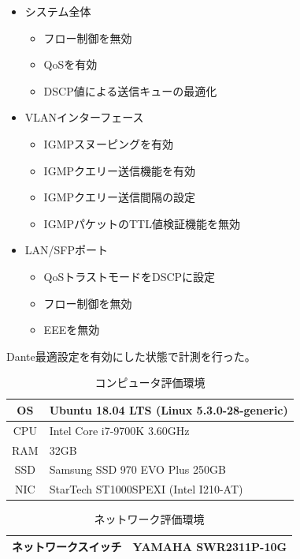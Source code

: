 \begin{itemize}
  \item システム全体
  \begin{itemize}
    \item フロー制御を無効
    \item QoSを有効
    \item DSCP値による送信キューの最適化
  \end{itemize}
  \item VLANインターフェース
  \begin{itemize}
    \item IGMPスヌーピングを有効
    \item IGMPクエリー送信機能を有効
    \item IGMPクエリー送信間隔の設定
    \item IGMPパケットのTTL値検証機能を無効
  \end{itemize}
  \item LAN/SFPポート
  \begin{itemize}
    \item QoSトラストモードをDSCPに設定
    \item フロー制御を無効
    \item EEEを無効
  \end{itemize}
\end{itemize}

Dante最適設定を有効にした状態で計測を行った。

\begin{table}[htb]
  \caption{コンピュータ評価環境}
  \label{tab:evaluation_computer}
  \centering
  \begin{tabular}{c|l} \hline
    OS & Ubuntu 18.04 LTS (Linux 5.3.0-28-generic)\\ \hline
    CPU & Intel Core i7-9700K 3.60GHz \\ \hline
    RAM & 32GB \\ \hline
    SSD & Samsung SSD 970 EVO Plus 250GB \\ \hline
    NIC & StarTech ST1000SPEXI (Intel I210-AT) \\ \hline
  \end{tabular}
\end{table}

\begin{table}[htb]
  \caption{ネットワーク評価環境}
  \label{tab:evaluation_network}
  \centering
  \begin{tabular}{c|l} \hline
    ネットワークスイッチ & YAMAHA SWR2311P-10G \\ \hline
  \end{tabular}
\end{table}

